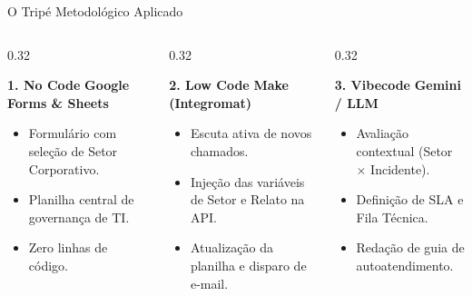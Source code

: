 \documentclass[aspectratio=169, 10pt]{beamer}
\begin{document}
\begin{frame}{O Tripé Metodológico Aplicado}
    \begin{columns}[T]
        \begin{column}{0.32\textwidth}
            \begin{block}{\textbf{1. No Code}}
                \textbf{Google Forms \& Sheets}
                \begin{itemize}
                    \item Formulário com seleção de Setor Corporativo.
                    \item Planilha central de governança de TI.
                    \item Zero linhas de código.
                \end{itemize}
            \end{block}
        \end{column}

        \begin{column}{0.32\textwidth}
            \begin{block}{\textbf{2. Low Code}}
                \textbf{Make (Integromat)}
                \begin{itemize}
                    \item Escuta ativa de novos chamados.
                    \item Injeção das variáveis de Setor e Relato na API.
                    \item Atualização da planilha e disparo de e-mail.
                \end{itemize}
            \end{block}
        \end{column}

        \begin{column}{0.32\textwidth}
            \begin{block}{\textbf{3. Vibecode}}
                \textbf{Gemini / LLM}
                \begin{itemize}
                    \item Avaliação contextual (Setor $\times$ Incidente).
                    \item Definição de SLA e Fila Técnica.
                    \item Redação de guia de autoatendimento.
                \end{itemize}
            \end{block}
        \end{column}
    \end{columns}
\end{frame}
\end{document}
